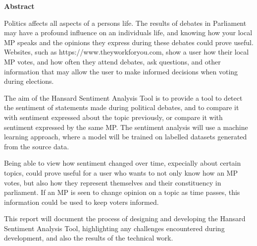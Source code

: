 \thispagestyle{empty}

\begin{center}
    {\LARGE\bf Abstract}
\end{center}

Politics affects all aspects of a persons life. The results of debates in Parliament may have a profound influence on an individuals life, and knowing how your local MP speaks and the opinions they express during these debates could prove useful. Websites, such as https://www.theyworkforyou.com, show a user how their local MP votes, and how often they attend debates, ask questions, and other information that may allow the user to make informed decisions when voting during elections.

The aim of the Hansard Sentiment Analysis Tool is to provide a tool to detect the sentiment of statements made during political debates, and to compare it with sentiment expressed about the topic previously, or compare it with sentiment expressed by the same MP. The sentiment analysis will use a machine learning approach, where a model will be trained on labelled datasets generated from the source data.

Being able to view how sentiment changed over time, expecially about certain topics, could prove useful for a user who wants to not only know how an MP votes, but also how they represent themselves and their constituency in parliament. If an MP is seen to change opinion on a topic as time passes, this information could be used to keep voters informed.

This report will document the process of designing and developing the Hansard Sentiment Analysis Tool, highlighting any challenges encountered during development, and also the results of the technical work.
